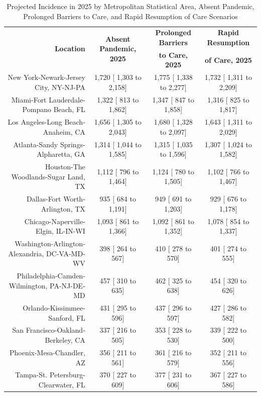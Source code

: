 \documentclass{article}
\begin{document}
\begin{table}[H]
	\caption{Projected Incidence in 2025 by Metropolitan Statistical Area, Absent Pandemic, Prolonged Barriers to Care, and Rapid Resumption of Care Scenarios}
	\footnotesize
	\begin{tabular}{|r|c|c|c|}
		\hline
		\multirow{2}{*}{\textbf{Location}} & \multirow{2}{*}{\textbf{Absent Pandemic, 2025}} & \textbf{Prolonged Barriers} & \textbf{Rapid Resumption}\\
		&  & \textbf{to Care, 2025} & \textbf{of Care, 2025}\\
		\hline\hline
		New York-Newark-Jersey City, NY-NJ-PA &  1,720 [ 1,303 to  2,158] &  1,775 [ 1,338 to  2,277] &  1,732 [ 1,311 to  2,209]\\
		Miami-Fort Lauderdale-Pompano Beach, FL &  1,322 [   813 to  1,862] &  1,347 [   847 to  1,858] &  1,316 [   825 to  1,817]\\
		Los Angeles-Long Beach-Anaheim, CA &  1,656 [ 1,305 to  2,043] &  1,680 [ 1,328 to  2,097] &  1,643 [ 1,311 to  2,029]\\
		Atlanta-Sandy Springs-Alpharetta, GA &  1,314 [ 1,044 to  1,585] &  1,315 [ 1,035 to  1,596] &  1,307 [ 1,024 to  1,582]\\
		Houston-The Woodlands-Sugar Land, TX &  1,112 [   796 to  1,464] &  1,124 [   780 to  1,505] &  1,102 [   766 to  1,467]\\
		Dallas-Fort Worth-Arlington, TX &    935 [   684 to  1,191] &    949 [   691 to  1,203] &    929 [   676 to  1,178]\\
		Chicago-Naperville-Elgin, IL-IN-WI &  1,093 [   861 to  1,366] &  1,092 [   861 to  1,352] &  1,078 [   854 to  1,337]\\
		Washington-Arlington-Alexandria, DC-VA-MD-WV &    398 [   264 to    567] &    410 [   278 to    570] &    401 [   274 to    555]\\
		Philadelphia-Camden-Wilmington, PA-NJ-DE-MD &    457 [   310 to    635] &    462 [   325 to    638] &    454 [   320 to    626]\\
		Orlando-Kissimmee-Sanford, FL &    431 [   295 to    596] &    437 [   296 to    597] &    427 [   286 to    582]\\
		San Francisco-Oakland-Berkeley, CA &    337 [   216 to    505] &    353 [   228 to    530] &    339 [   222 to    500]\\
		Phoenix-Mesa-Chandler, AZ &    356 [   211 to    561] &    361 [   216 to    579] &    352 [   211 to    556]\\
		Tampa-St. Petersburg-Clearwater, FL &    370 [   227 to    609] &    377 [   231 to    606] &    367 [   227 to    586]\\

\end{tabular}
\end{table}
\end{document}
